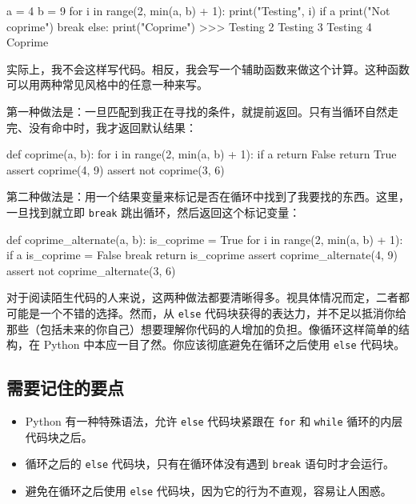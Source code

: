 \begin{codebox}[python]
a = 4
b = 9
for i in range(2, min(a, b) + 1):
    print("Testing", i)
    if a %
        print("Not coprime")
        break
else:
    print("Coprime")
>>>
Testing 2
Testing 3
Testing 4
Coprime
\end{codebox}

实际上，我不会这样写代码。相反，我会写一个辅助函数来做这个计算。这种函数可以用两种常见风格中的任意一种来写。

第一种做法是：一旦匹配到我正在寻找的条件，就提前返回。只有当循环自然走完、没有命中时，我才返回默认结果：

\begin{codebox}[python]
def coprime(a, b):
    for i in range(2, min(a, b) + 1):
        if a %
            return False
    return True
assert coprime(4, 9)
assert not coprime(3, 6)
\end{codebox}

第二种做法是：用一个结果变量来标记是否在循环中找到了我要找的东西。这里，一旦找到就立即 \texttt{break} 跳出循环，然后返回这个标记变量：

\begin{codebox}[python]
def coprime_alternate(a, b):
    is_coprime = True
    for i in range(2, min(a, b) + 1):
        if a %
            is_coprime = False
            break
    return is_coprime
assert coprime_alternate(4, 9)
assert not coprime_alternate(3, 6)
\end{codebox}

对于阅读陌生代码的人来说，这两种做法都要清晰得多。视具体情况而定，二者都可能是一个不错的选择。然而，从 \texttt{else} 代码块获得的表达力，并不足以抵消你给那些（包括未来的你自己）想要理解你代码的人增加的负担。像循环这样简单的结构，在 Python 中本应一目了然。你应该彻底避免在循环之后使用 \texttt{else} 代码块。

\subsection{需要记住的要点}
\begin{itemize}
\item Python 有一种特殊语法，允许 \texttt{else} 代码块紧跟在 \texttt{for} 和 \texttt{while} 循环的内层代码块之后。
\item 循环之后的 \texttt{else} 代码块，只有在循环体没有遇到 \texttt{break} 语句时才会运行。
\item 避免在循环之后使用 \texttt{else} 代码块，因为它的行为不直观，容易让人困惑。
\end{itemize}

